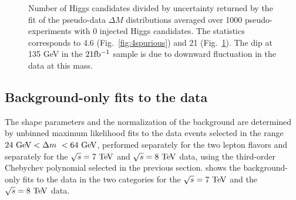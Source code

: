 \begin{figure}[htbp]
\begin{subfigure}[b]{0.45\textwidth}
      \caption{}
      \label{fig:21spurious}
    \end{subfigure}
    \caption{Number of Higgs candidates divided by uncertainty 
    returned by the fit of the pseudo-data $\Delta M$ distributions averaged over 
    1000 pseudo-experiments with 0 injected Higgs candidates. 
    The statistics corresponds to 4.6 \ifb (Fig.~\ref{fig:4spurious})
    and 21 \ifb (Fig.~\ref{fig:21spurious}). The dip at 135 GeV in the
    $21 \mbox{fb$^{-1}$}$ sample is due to downward fluctuation in the data at this mass.}
    \label{fig:spurioussignal}
\end{figure}

\subsection{Background-only fits to the data}
The shape parameters and the normalization of the background are determined
by unbinned maximum likelihood fits to the data events selected in the
range $24 \GeV < \dm < 64 \GeV$, performed separately for the two lepton flavors 
and separately for the $\rts = 7 \TeV$ and $\rts = 8 \TeV$ data, using the third-order
Chebychev polynomial selected in the previous section. 
 shows the background-only fits to the data in the
two categories for the $\rts = 7 \TeV$ and the $\rts = 8 \TeV$ data.

